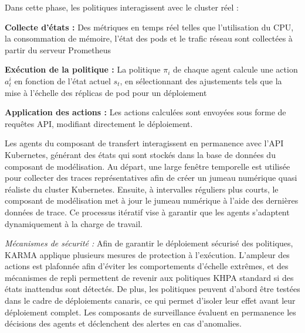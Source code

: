 

Dans cette phase, les politiques interagissent avec le cluster réel :
\begin{enumerate*}[label=\textbf{\arabic*)}, itemjoin={;\quad }]
    \item \textbf{Collecte d'états :} Des métriques en temps réel telles que l'utilisation du CPU, la consommation de mémoire, l'état des pods et le trafic réseau sont collectées à partir du serveur Prometheus~\cite{prometheus}
    \item \textbf{Exécution de la politique :} La politique $\pi_i$ de chaque agent calcule une action $a_t^i$ en fonction de l'état actuel $s_t$, en sélectionnant des ajustements tels que la mise à l'échelle des réplicas de pod pour un déploiement
    \item \textbf{Application des actions :} Les actions calculées sont envoyées sous forme de requêtes API, modifiant directement le déploiement.
\end{enumerate*}

Les agents du composant de transfert interagissent en permanence avec l'API Kubernetes, générant des états qui sont stockés dans la base de données du composant de modélisation. Au départ, une large fenêtre temporelle est utilisée pour collecter des traces représentatives afin de créer un jumeau numérique quasi réaliste du cluster Kubernetes. Ensuite, à intervalles réguliers plus courts, le composant de modélisation met à jour le jumeau numérique à l'aide des dernières données de trace. Ce processus itératif vise à garantir que les agents s'adaptent dynamiquement à la charge de travail.

\noindent \textit{Mécanismes de sécurité :} Afin de garantir le déploiement sécurisé des politiques, KARMA applique plusieurs mesures de protection à l'exécution. L'ampleur des actions est plafonnée afin d'éviter les comportements d'échelle extrêmes, et des mécanismes de repli permettent de revenir aux politiques KHPA standard si des états inattendus sont détectés. De plus, les politiques peuvent d'abord être testées dans le cadre de déploiements canaris, ce qui permet d'isoler leur effet avant leur déploiement complet. Les composants de surveillance évaluent en permanence les décisions des agents et déclenchent des alertes en cas d'anomalies.

